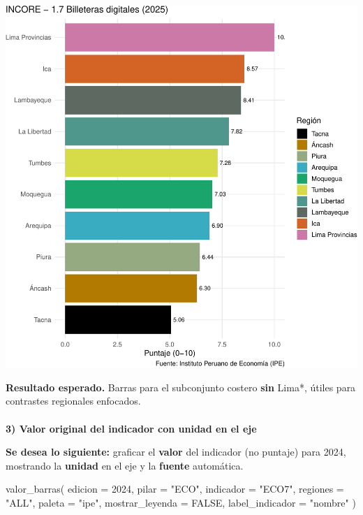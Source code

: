 \documentclass[
  11pt,
  letterpaper,
  DIV=11,
  numbers=noendperiod]{scrartcl}
\makeatletter
\let\oldparagraph\paragraph
\renewcommand{\paragraph}{
    \@ifstar
      \xxxParagraphStar
      \xxxParagraphNoStar
  }
\newcommand{\xxxParagraphStar}[1]{\oldparagraph*{#1}\mbox{}}
\newcommand{\xxxParagraphNoStar}[1]{\oldparagraph{#1}\mbox{}}
\newenvironment{Shaded}{\begin{snugshade}}{\end{snugshade}}
\newcommand{\AttributeTok}[1]{\textcolor[rgb]{0.40,0.45,0.13}{#1}}
\newcommand{\ConstantTok}[1]{\textcolor[rgb]{0.56,0.35,0.01}{#1}}
\newcommand{\DecValTok}[1]{\textcolor[rgb]{0.68,0.00,0.00}{#1}}
\newcommand{\FunctionTok}[1]{\textcolor[rgb]{0.28,0.35,0.67}{#1}}
\newcommand{\NormalTok}[1]{\textcolor[rgb]{0.00,0.23,0.31}{#1}}
\newcommand{\StringTok}[1]{\textcolor[rgb]{0.13,0.47,0.30}{#1}}
\makeatother
\begin{document}
\includegraphics{Manual_files/figure-pdf/unnamed-chunk-74-1.pdf}

\textbf{Resultado esperado.} Barras para el subconjunto costero
\textbf{sin} Lima*, útiles para contrastes regionales enfocados.

\paragraph{\texorpdfstring{\textbf{3) Valor original del indicador con
unidad en el
eje}}{3) Valor original del indicador con unidad en el eje}}\label{valor-original-del-indicador-con-unidad-en-el-eje}

\textbf{Se desea lo siguiente:} graficar el \textbf{valor} del indicador
(no puntaje) para 2024, mostrando la \textbf{unidad} en el eje y la
\textbf{fuente} automática.

\begin{Shaded}
\begin{Highlighting}[]
\FunctionTok{valor\_barras}\NormalTok{(}
  \AttributeTok{edicion   =} \DecValTok{2024}\NormalTok{,}
  \AttributeTok{pilar     =} \StringTok{"ECO"}\NormalTok{,}
  \AttributeTok{indicador =} \StringTok{"ECO7"}\NormalTok{,}
  \AttributeTok{regiones  =} \StringTok{"ALL"}\NormalTok{,}
  \AttributeTok{paleta    =} \StringTok{"ipe"}\NormalTok{,}
  \AttributeTok{mostrar\_leyenda =} \ConstantTok{FALSE}\NormalTok{,}
  \AttributeTok{label\_indicador =} \StringTok{"nombre"}
\NormalTok{)}
\end{Highlighting}
\end{Shaded}
\end{document}

